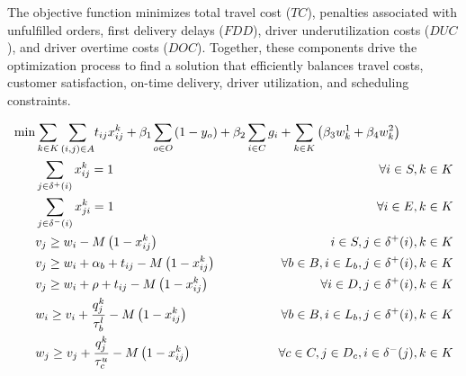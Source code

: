 \documentclass{article}
\begin{document}
The objective function minimizes total travel cost ($TC$), penalties associated with unfulfilled orders, first delivery delays ($FDD$), driver underutilization costs ($DUC$), and driver overtime costs ($DOC$). Together, these components drive the optimization process to find a solution that efficiently balances travel costs, customer satisfaction, on-time delivery, driver utilization, and scheduling constraints.

{
\small
\begin{alignat}{3}
    \label{mod:obj}   \min & \sum_{k \in K}{{ \sum_{ \substack{(i,j) \in A} }} {t_{ij}x^{k}_{ij}}} + \beta_1\smashoperator{\sum_{ o \in O}}{  \left(1-y_o\right)} \hspace{-0mm}  + \beta_2 \smashoperator{ \sum_{i \in C } } { g_i  } +  \sum_{k \in K}\left({\beta_3 w^{1}_k  + \beta_4  w^{2}_k}\right) &                             \\
    \label{mod:c1}         & \sum_{j \in \delta^{+}(i) }{x^k_{ij}} =1   & \hspace{-10mm}  \forall i \in S, k \in K   \\
    \label{mod:c2}         & \sum_{j \in \delta^{-}(i)}{x^k_{ji}} = 1     & \hspace{-10mm} \forall i \in E, k \in K\\
    \label{mod:c03}        & v_j \geq  w_i  - M\left(1-x^{k}_{ij}\right)   & \hspace{-30mm}  i \in S, j \in \delta^{+}(i),  k \in K      \\
    \label{mod:c3}         & v_j \geq  w_i + \alpha_{b} + t_{ij} - M\left(1-x^{k}_{ij}\right) & \hspace{-40mm} \forall b \in B, i \in L_b, j \in \delta^{+}(i),  k \in K     \\
    \label{mod:c4}         & v_j \geq  w_i + \rho + t_{ij} - M\left(1-x^{k}_{ij}\right)                                                                       & \hspace{-40mm} \forall i \in D  , j \in \delta^{+}(i), k \in K                         \\
    \label{mod:c5}         & w_{i} \geq v_{i}  + \frac{q^k_j}{\tau^l_b} -M\left(1- x^{k}_{ij}\right)   & \hspace{-40mm} \forall  b \in B,  i \in L_{b},  j \in \delta^{+}(i), k \in K \\
    \label{mod:c6}         & w_{j} \geq v_{j}  + {  \frac{q^k_j}{\tau^u_c} -M\left(1- x^{k}_{ij}\right) }     & \hspace{-40mm}  \forall c \in  C, j \in D_{c}, i \in \delta^{-}(j),  k \in K \\

\end{alignat}}
\end{document}
